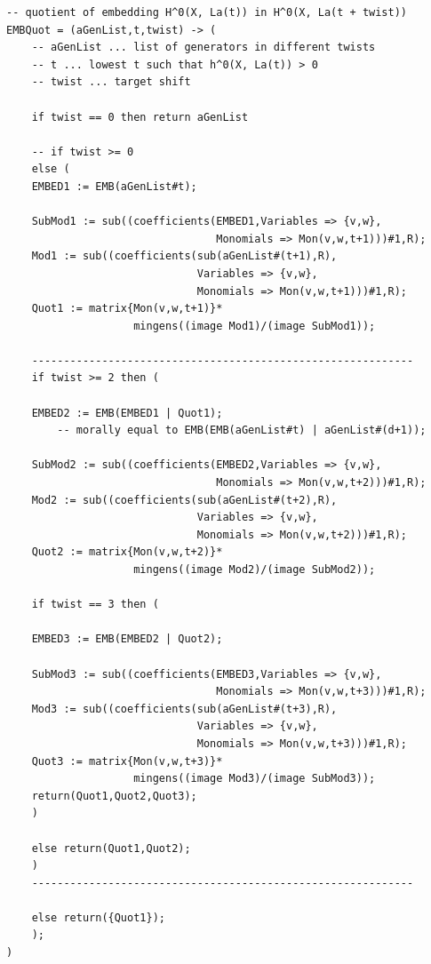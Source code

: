 \documentclass[a4paper,10pt]{amsart}
\theoremstyle{definition}
\theoremstyle{plain}
\begin{document}
\begin{oframed}
\begin{verbatim}
-- quotient of embedding H^0(X, La(t)) in H^0(X, La(t + twist))
EMBQuot = (aGenList,t,twist) -> (
    -- aGenList ... list of generators in different twists
    -- t ... lowest t such that h^0(X, La(t)) > 0
    -- twist ... target shift
    
    if twist == 0 then return aGenList

    -- if twist >= 0
    else (
    EMBED1 := EMB(aGenList#t);
    
    SubMod1 := sub((coefficients(EMBED1,Variables => {v,w},
                                 Monomials => Mon(v,w,t+1)))#1,R);
    Mod1 := sub((coefficients(sub(aGenList#(t+1),R),
                              Variables => {v,w},
                              Monomials => Mon(v,w,t+1)))#1,R);
    Quot1 := matrix{Mon(v,w,t+1)}*
                    mingens((image Mod1)/(image SubMod1));

    ------------------------------------------------------------
    if twist >= 2 then (
    
    EMBED2 := EMB(EMBED1 | Quot1);
        -- morally equal to EMB(EMB(aGenList#t) | aGenList#(d+1));
        
    SubMod2 := sub((coefficients(EMBED2,Variables => {v,w},
                                 Monomials => Mon(v,w,t+2)))#1,R);
    Mod2 := sub((coefficients(sub(aGenList#(t+2),R),
                              Variables => {v,w},
                              Monomials => Mon(v,w,t+2)))#1,R);
    Quot2 := matrix{Mon(v,w,t+2)}*
                    mingens((image Mod2)/(image SubMod2));
    
    if twist == 3 then (
    
    EMBED3 := EMB(EMBED2 | Quot2);
    
    SubMod3 := sub((coefficients(EMBED3,Variables => {v,w},
                                 Monomials => Mon(v,w,t+3)))#1,R);
    Mod3 := sub((coefficients(sub(aGenList#(t+3),R),
                              Variables => {v,w},
                              Monomials => Mon(v,w,t+3)))#1,R);
    Quot3 := matrix{Mon(v,w,t+3)}*
                    mingens((image Mod3)/(image SubMod3));
    return(Quot1,Quot2,Quot3);
    )
    
    else return(Quot1,Quot2);
    )
    ------------------------------------------------------------
    
    else return({Quot1});
    );
)
\end{verbatim}
\end{oframed}
\end{document}
